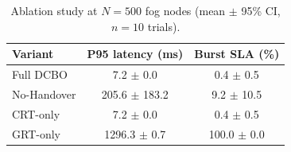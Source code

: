 \begin{table}[!t]
\centering
\caption{Ablation study at $N=500$ fog nodes (mean $\pm$ 95\% CI, $n=10$ trials).}
\label{tab:ablation}
\fgcsTableCol
\begin{tabular*}{\columnwidth}{@{\extracolsep{\fill}}lcc@{}}
\toprule
\textbf{Variant} & \textbf{P95 latency (ms)} & \textbf{Burst SLA (\%)} \\
\midrule
Full DCBO & 7.2 $\pm$ 0.0 & 0.4 $\pm$ 0.5 \\
No-Handover & 205.6 $\pm$ 183.2 & 9.2 $\pm$ 10.5 \\
CRT-only & 7.2 $\pm$ 0.0 & 0.4 $\pm$ 0.5 \\
GRT-only & 1296.3 $\pm$ 0.7 & 100.0 $\pm$ 0.0 \\
\bottomrule
\end{tabular*}
\end{table}
